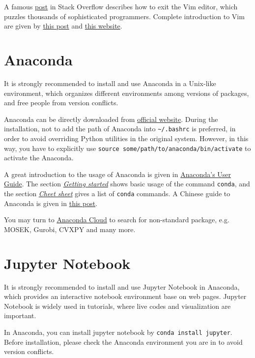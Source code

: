 \documentclass[english]{../TeXTemplate/pkupaper}
\begin{document}
A famous \href{https://stackoverflow.com/questions/11828270/how-to-exit-the-vim-editor}{post} in Stack Overflow describes how to exit the Vim editor, which puzzles thousands of sophisticated programmers. Complete introduction to Vim are given by \href{http://www.jianshu.com/p/bcbe916f97e1}{this post} and \href{https://blog.interlinked.org/tutorials/vim_tutorial.html}{this website}.

\section{Anaconda}

It is strongly recommended to install and use Anaconda in a Unix-like environment, which organizes different environments among versions of packages, and free people from version conflicts.

Anaconda can be directly downloaded from \href{https://www.anaconda.com/download/}{official website}. During the installation, not to add the path of Anaconda into \verb"~/.bashrc" is preferred, in order to avoid overriding Python utilities in the original system. However, in this way, you have to explicitly use \verb"source some/path/to/anaconda/bin/activate" to activate the Anaconda.

A great introduction to the usage of Anaconda is given in \href{https://conda.io/docs/user-guide/index.html}{Anaconda's User Guide}. The section \href{https://conda.io/docs/user-guide/getting-started.html}{\emph{Getting started}} shows basic usage of the command \verb"conda", and the section \href{https://conda.io/docs/user-guide/cheatsheet.html}{\emph{Cheet sheet}} gives a list of \verb"conda" commands. A Chinese guide to Anaconda is given in \href{http://www.jianshu.com/p/169403f7e40c}{this post}.

You may turn to \href{https://anaconda.org/}{Anaconda Cloud} to search for non-standard package, e.g. MOSEK, Gurobi, CVXPY and many more.

\section{Jupyter Notebook}

It is strongly recommended to install and use Jupyter Notebook in Anaconda, which provides an interactive notebook environment base on web pages. Jupyter Notebook is widely used in tutorials, where live codes and visualization are important.

In Anaconda, you can install jupyter notebook by \verb"conda install jupyter". Before installation, please check the Anaconda environment you are in to avoid version conflicts.
\end{document}
